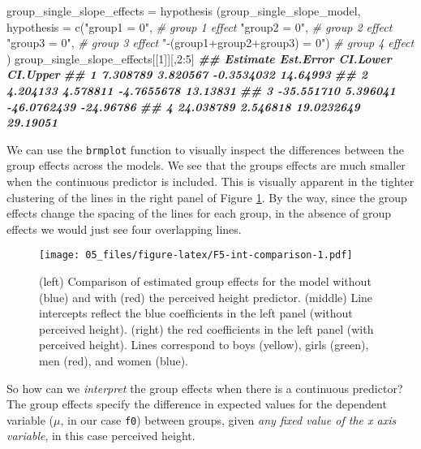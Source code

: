 \documentclass[
]{book}
\newenvironment{Shaded}{\begin{snugshade}}{\end{snugshade}}
\newcommand{\AttributeTok}[1]{\textcolor[rgb]{0.77,0.63,0.00}{#1}}
\newcommand{\CommentTok}[1]{\textcolor[rgb]{0.56,0.35,0.01}{\textit{#1}}}
\newcommand{\DecValTok}[1]{\textcolor[rgb]{0.00,0.00,0.81}{#1}}
\newcommand{\DocumentationTok}[1]{\textcolor[rgb]{0.56,0.35,0.01}{\textbf{\textit{#1}}}}
\newcommand{\FunctionTok}[1]{\textcolor[rgb]{0.00,0.00,0.00}{#1}}
\newcommand{\NormalTok}[1]{#1}
\newcommand{\OtherTok}[1]{\textcolor[rgb]{0.56,0.35,0.01}{#1}}
\newcommand{\SpecialCharTok}[1]{\textcolor[rgb]{0.00,0.00,0.00}{#1}}
\newcommand{\StringTok}[1]{\textcolor[rgb]{0.31,0.60,0.02}{#1}}
\begin{document}
\begin{Shaded}
\begin{Highlighting}[]

\NormalTok{group\_single\_slope\_effects }\OtherTok{=} 
  \FunctionTok{hypothesis}\NormalTok{ (group\_single\_slope\_model,}
              \AttributeTok{hypothesis =} \FunctionTok{c}\NormalTok{(}\StringTok{"group1 = 0"}\NormalTok{, }\CommentTok{\# group 1 effect}
                             \StringTok{"group2 = 0"}\NormalTok{, }\CommentTok{\# group 2 effect }
                             \StringTok{"group3 = 0"}\NormalTok{, }\CommentTok{\# group 3 effect}
                             \StringTok{"{-}(group1+group2+group3) = 0"}\NormalTok{) }\CommentTok{\# group 4 effect}
\NormalTok{)   }
\NormalTok{group\_single\_slope\_effects[[}\DecValTok{1}\NormalTok{]][,}\DecValTok{2}\SpecialCharTok{:}\DecValTok{5}\NormalTok{]}
\DocumentationTok{\#\#     Estimate Est.Error    CI.Lower  CI.Upper}
\DocumentationTok{\#\# 1   7.308789  3.820567  {-}0.3534032  14.64993}
\DocumentationTok{\#\# 2   4.204133  4.578811  {-}4.7655678  13.13831}
\DocumentationTok{\#\# 3 {-}35.551710  5.396041 {-}46.0762439 {-}24.96786}
\DocumentationTok{\#\# 4  24.038789  2.546818  19.0232649  29.19051}
\end{Highlighting}
\end{Shaded}

We can use the \texttt{brmplot} function to visually inspect the differences between the group effects across the models. We see that the groups effects are much smaller when the continuous predictor is included. This is visually apparent in the tighter clustering of the lines in the right panel of Figure \ref{fig:F5-int-comparison}. By the way, since the group effects change the spacing of the lines for each group, in the absence of group effects we would just see four overlapping lines.

\begin{figure}
\centering
\texttt{[image: 05\_files/figure-latex/F5-int-comparison-1.pdf]}
\caption{\label{fig:F5-int-comparison} (left) Comparison of estimated group effects for the model without (blue) and with (red) the perceived height predictor. (middle) Line intercepts reflect the blue coefficients in the left panel (without perceived height). (right) the red coefficients in the left panel (with perceived height). Lines correspond to boys (yellow), girls (green), men (red), and women (blue).}
\end{figure}

So how can we \emph{interpret} the group effects when there is a continuous predictor? The group effects specify the difference in expected values for the dependent variable (\(\mu\), in our case \texttt{f0}) between groups, given \emph{any fixed value of the x axis variable}, in this case perceived height.
\end{document}
